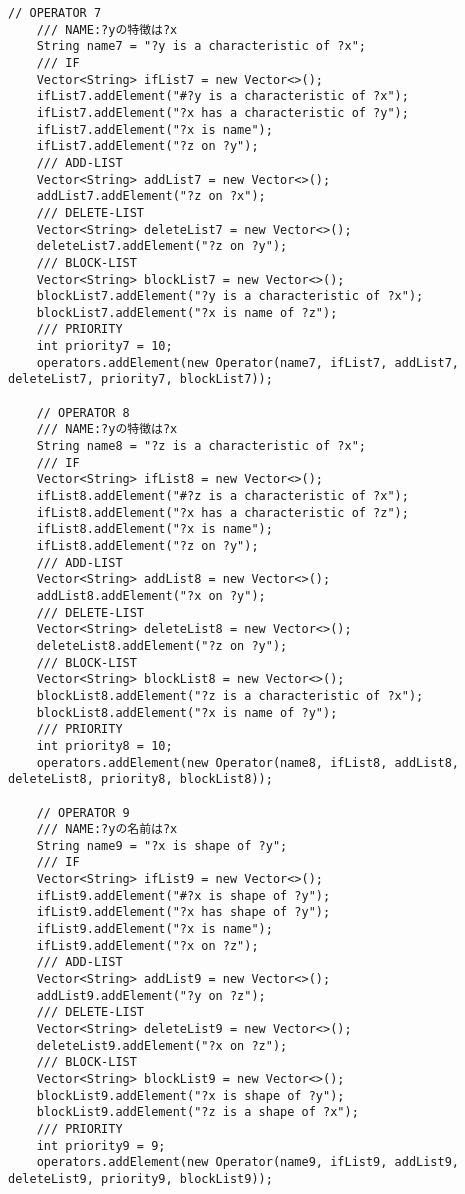 \documentclass{jarticle}
\begin{document}
\begin{lstlisting}[caption=色や形を扱うオペレータ,label=src:operator]
    // OPERATOR 7
    /// NAME:?yの特徴は?x
    String name7 = "?y is a characteristic of ?x";
    /// IF
    Vector<String> ifList7 = new Vector<>();
    ifList7.addElement("#?y is a characteristic of ?x");
    ifList7.addElement("?x has a characteristic of ?y");
    ifList7.addElement("?x is name");
    ifList7.addElement("?z on ?y");
    /// ADD-LIST
    Vector<String> addList7 = new Vector<>();
    addList7.addElement("?z on ?x");
    /// DELETE-LIST
    Vector<String> deleteList7 = new Vector<>();
    deleteList7.addElement("?z on ?y");
    /// BLOCK-LIST
    Vector<String> blockList7 = new Vector<>();
    blockList7.addElement("?y is a characteristic of ?x");
    blockList7.addElement("?x is name of ?z");
    /// PRIORITY
    int priority7 = 10;
    operators.addElement(new Operator(name7, ifList7, addList7, deleteList7, priority7, blockList7));
    
    // OPERATOR 8
    /// NAME:?yの特徴は?x
    String name8 = "?z is a characteristic of ?x";
    /// IF
    Vector<String> ifList8 = new Vector<>();
    ifList8.addElement("#?z is a characteristic of ?x");
    ifList8.addElement("?x has a characteristic of ?z");
    ifList8.addElement("?x is name");
    ifList8.addElement("?z on ?y");
    /// ADD-LIST
    Vector<String> addList8 = new Vector<>();
    addList8.addElement("?x on ?y");
    /// DELETE-LIST
    Vector<String> deleteList8 = new Vector<>();
    deleteList8.addElement("?z on ?y");
    /// BLOCK-LIST
    Vector<String> blockList8 = new Vector<>();
    blockList8.addElement("?z is a characteristic of ?x");
    blockList8.addElement("?x is name of ?y");
    /// PRIORITY
    int priority8 = 10;
    operators.addElement(new Operator(name8, ifList8, addList8, deleteList8, priority8, blockList8));
    
    // OPERATOR 9
    /// NAME:?yの名前は?x
    String name9 = "?x is shape of ?y";
    /// IF
    Vector<String> ifList9 = new Vector<>();
    ifList9.addElement("#?x is shape of ?y");
    ifList9.addElement("?x has shape of ?y");
    ifList9.addElement("?x is name");
    ifList9.addElement("?x on ?z");
    /// ADD-LIST
    Vector<String> addList9 = new Vector<>();
    addList9.addElement("?y on ?z");
    /// DELETE-LIST
    Vector<String> deleteList9 = new Vector<>();
    deleteList9.addElement("?x on ?z");
    /// BLOCK-LIST
    Vector<String> blockList9 = new Vector<>();
    blockList9.addElement("?x is shape of ?y");
    blockList9.addElement("?z is a shape of ?x");
    /// PRIORITY
    int priority9 = 9;
    operators.addElement(new Operator(name9, ifList9, addList9, deleteList9, priority9, blockList9));
    

\end{lstlisting}
\end{document}
